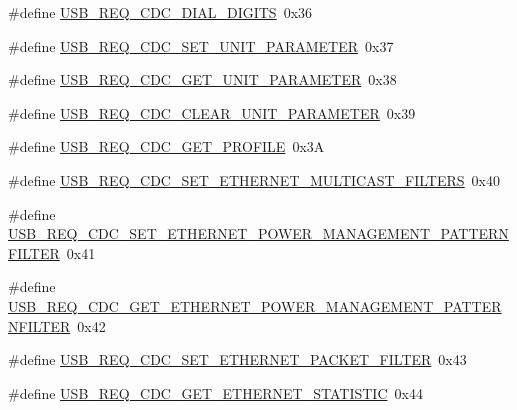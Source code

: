 \begin{DoxyCompactItemize}
\#define \hyperlink{group__cdc__protocol__group_ga68985a9191870bd17d55657d413a17da}{\-U\-S\-B\-\_\-\-R\-E\-Q\-\_\-\-C\-D\-C\-\_\-\-D\-I\-A\-L\-\_\-\-D\-I\-G\-I\-T\-S}~0x36
\item 
\#define \hyperlink{group__cdc__protocol__group_gaa9d1d583e759b94bec18d8ae2c5b830c}{\-U\-S\-B\-\_\-\-R\-E\-Q\-\_\-\-C\-D\-C\-\_\-\-S\-E\-T\-\_\-\-U\-N\-I\-T\-\_\-\-P\-A\-R\-A\-M\-E\-T\-E\-R}~0x37
\item 
\#define \hyperlink{group__cdc__protocol__group_gaa1dbd05f95ee9fa9b0a18c3baaf70510}{\-U\-S\-B\-\_\-\-R\-E\-Q\-\_\-\-C\-D\-C\-\_\-\-G\-E\-T\-\_\-\-U\-N\-I\-T\-\_\-\-P\-A\-R\-A\-M\-E\-T\-E\-R}~0x38
\item 
\#define \hyperlink{group__cdc__protocol__group_ga27d474737f5224baecff3f702aea647c}{\-U\-S\-B\-\_\-\-R\-E\-Q\-\_\-\-C\-D\-C\-\_\-\-C\-L\-E\-A\-R\-\_\-\-U\-N\-I\-T\-\_\-\-P\-A\-R\-A\-M\-E\-T\-E\-R}~0x39
\item 
\#define \hyperlink{group__cdc__protocol__group_ga4f0045336cd0d38e988a424bbcb8fce3}{\-U\-S\-B\-\_\-\-R\-E\-Q\-\_\-\-C\-D\-C\-\_\-\-G\-E\-T\-\_\-\-P\-R\-O\-F\-I\-L\-E}~0x3\-A
\item 
\#define \hyperlink{group__cdc__protocol__group_ga68617aa6e12d072222b232ab71f9e226}{\-U\-S\-B\-\_\-\-R\-E\-Q\-\_\-\-C\-D\-C\-\_\-\-S\-E\-T\-\_\-\-E\-T\-H\-E\-R\-N\-E\-T\-\_\-\-M\-U\-L\-T\-I\-C\-A\-S\-T\-\_\-\-F\-I\-L\-T\-E\-R\-S}~0x40
\item 
\#define \hyperlink{group__cdc__protocol__group_ga43abcd76b528dfc9cf1efbf3ba37bab0}{\-U\-S\-B\-\_\-\-R\-E\-Q\-\_\-\-C\-D\-C\-\_\-\-S\-E\-T\-\_\-\-E\-T\-H\-E\-R\-N\-E\-T\-\_\-\-P\-O\-W\-E\-R\-\_\-\-M\-A\-N\-A\-G\-E\-M\-E\-N\-T\-\_\-\-P\-A\-T\-T\-E\-R\-N\-F\-I\-L\-T\-E\-R}~0x41
\item 
\#define \hyperlink{group__cdc__protocol__group_ga4bcd264cbcf653c18532ed313b818ee5}{\-U\-S\-B\-\_\-\-R\-E\-Q\-\_\-\-C\-D\-C\-\_\-\-G\-E\-T\-\_\-\-E\-T\-H\-E\-R\-N\-E\-T\-\_\-\-P\-O\-W\-E\-R\-\_\-\-M\-A\-N\-A\-G\-E\-M\-E\-N\-T\-\_\-\-P\-A\-T\-T\-E\-R\-N\-F\-I\-L\-T\-E\-R}~0x42
\item 
\#define \hyperlink{group__cdc__protocol__group_ga7d4e4730f093e5af9870351470093562}{\-U\-S\-B\-\_\-\-R\-E\-Q\-\_\-\-C\-D\-C\-\_\-\-S\-E\-T\-\_\-\-E\-T\-H\-E\-R\-N\-E\-T\-\_\-\-P\-A\-C\-K\-E\-T\-\_\-\-F\-I\-L\-T\-E\-R}~0x43
\item 
\#define \hyperlink{group__cdc__protocol__group_gaa035e847093134f53d71bd46d346a7fc}{\-U\-S\-B\-\_\-\-R\-E\-Q\-\_\-\-C\-D\-C\-\_\-\-G\-E\-T\-\_\-\-E\-T\-H\-E\-R\-N\-E\-T\-\_\-\-S\-T\-A\-T\-I\-S\-T\-I\-C}~0x44
\item 

\end{DoxyCompactItemize}
